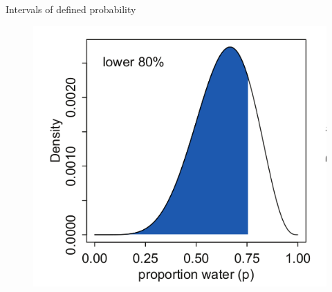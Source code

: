\documentclass[handout]{beamer}
\begin{document}
\begin{frame}{Intervals of defined probability}
\scriptsize{

   \begin{figure}[h!]
	\centering
	\includegraphics[scale=0.45]{pics/interval3.png}
	\end{figure} 




} 

\end{frame}
\end{document}
